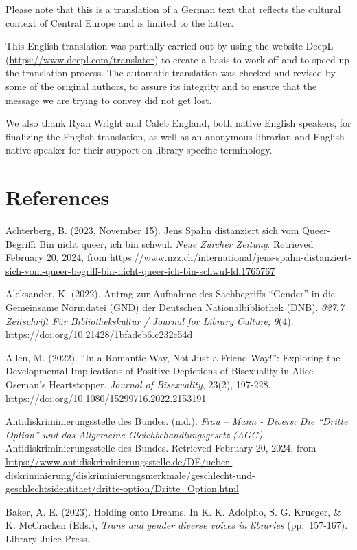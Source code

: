 \documentclass[a4paper,
fontsize=11pt,
oneside,
numbers=noperiodatend,
parskip=half-,
bibliography=totoc,
final
]{scrartcl}
\begin{document}
Please note that this is a translation of a German text that reflects
the cultural context of Central Europe and is limited to the latter.

This English translation was partially carried out by using the website
DeepL (\url{https://www.deepl.com/translator}) to create a basis to work
off and to speed up the translation process. The automatic translation
was checked and revised by some of the original authors, to assure its
integrity and to ensure that the message we are trying to convey did not
get lost.

We also thank Ryan Wright and Caleb England, both native English
speakers, for finalizing the English translation, as well as an
anonymous librarian and English native speaker for their support on
library-specific terminology.

\hypertarget{references}{%
\section{References}\label{references}}

Achterberg, B. (2023, November 15). Jens Spahn distanziert sich vom
Queer-Begriff: Bin nicht queer, ich bin schwul. \emph{Neue Zürcher
Zeitung}. Retrieved February 20, 2024, from
\url{https://www.nzz.ch/international/jens-spahn-distanziert-sich-vom-queer-begriff-bin-nicht-queer-ich-bin-schwul-ld.1765767}

Aleksander, K. (2022). Antrag zur Aufnahme des Sachbegriffs
\enquote{Gender} in die Gemeinsame Normdatei (GND) der Deutschen
Nationalbibliothek (DNB). \emph{027.7 Zeitschrift Für Bibliothekskultur
/ Journal for Library Culture}, \emph{9}(4).
\url{https://doi.org/10.21428/1bfadeb6.c232c54d}

Allen, M. (2022). \enquote{In a Romantic Way, Not Just a Friend Way!}: Exploring
the Developmental Implications of Positive Depictions of Bisexuality in
Alice Oseman's Heartstopper. \emph{Journal of
Bisexuality}, 23(2), 197-228.
\url{https://doi.org/10.1080/15299716.2022.2153191}

Antidiskriminierungsstelle des Bundes. (n.d.). \emph{Frau -- Mann -
Divers: Die \enquote{Dritte Option} und das Allgemeine
Gleichbehandlungsgesetz (AGG)}. Antidiskriminierungsstelle des Bundes.
Retrieved February 20, 2024, from
\url{https://www.antidiskriminierungsstelle.de/DE/ueber-diskriminierung/diskriminierungsmerkmale/geschlecht-und-geschlechtsidentitaet/dritte-option/Dritte_Option.html}

Baker, A. E. (2023). Holding onto Dreams. In K. K. Adolpho, S. G.
Krueger, \& K. McCracken (Eds.), \emph{Trans and gender diverse voices
in libraries} (pp.~157-167). Library Juice Press.
\end{document}
